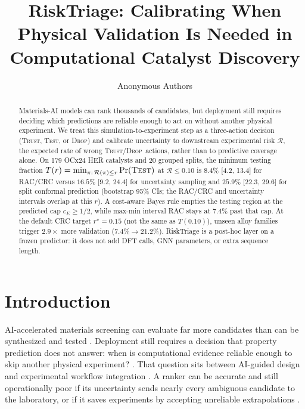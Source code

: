 \documentclass{article}
\title{RiskTriage: Calibrating When Physical Validation Is Needed
in Computational Catalyst Discovery}
\author{Anonymous Authors}
\newcommand{\test}{\textsc{Test}}
\newcommand{\trust}{\textsc{Trust}}
\newcommand{\dropa}{\textsc{Drop}}
\newcommand{\risk}{\mathcal{R}}
\begin{document}
\maketitle

\begin{abstract}
Materials-AI models can rank thousands of candidates, but deployment still requires deciding which predictions are reliable enough to act on without another physical experiment.
We treat this simulation-to-experiment step as a three-action decision (\trust, \test, or \dropa) and calibrate uncertainty to downstream experimental risk $\risk$, the expected rate of wrong \trust/\dropa\ actions, rather than to predictive coverage alone.
On 179 OCx24 HER catalysts and 20 grouped splits, the minimum testing fraction $T(r)=\min_{\pi:\,\risk(\pi)\le r}\Pr(\test)$ at $\risk\le 0.10$ is $8.4\%$ [4.2, 13.4] for RAC/CRC versus $16.5\%$ [9.2, 24.4] for uncertainty sampling and $25.9\%$ [22.3, 29.6] for split conformal prediction (bootstrap 95\% CIs; the RAC/CRC and uncertainty intervals overlap at this $r$).
A cost-aware Bayes rule empties the testing region at the predicted cap $c_E\ge 1/2$, while max-min interval RAC stays at $7.4\%$ past that cap.
At the default CRC target $r^\star=0.15$ (not the same as $T(0.10)$), unseen alloy families trigger $2.9\times$ more validation ($7.4\%\to 21.2\%$).
RiskTriage is a post-hoc layer on a frozen predictor: it does not add DFT calls, GNN parameters, or extra sequence length.
\end{abstract}

\section{Introduction}

AI-accelerated materials screening can evaluate far more candidates than can be synthesized and tested
\citep{butler2018ml,jain2013materials,ramprasad2017materials,lookman2019active,merchant2023scaling}.
Deployment still requires a decision that property prediction does not answer: when is computational evidence reliable enough to skip another physical experiment?
\citep{chow1970reject,geifman2017selective,angelopoulos2021gentle}.
That question sits between AI-guided design and experimental workflow integration
\citep{kusne2020closedloop,szymanski2023autonomous,floresleonar2020maps}.
A ranker can be accurate and still operationally poor if its uncertainty sends nearly every ambiguous candidate to the laboratory, or if it saves experiments by accepting unreliable extrapolations
\citep{tran2021active,gruich2023trust,tibshirani2019covariate}.
\end{document}

